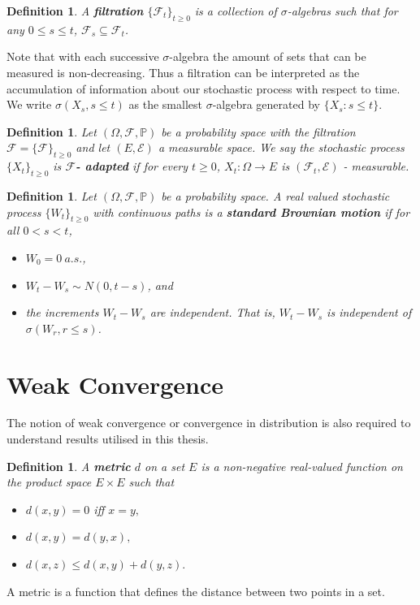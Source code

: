 \documentclass[honours,12pt,twoside, openright]{unswthesis}
\newcommand{\PP}{\mathbb{P}}
\newcommand{\1}{\mathbf 1}
\newcommand{\FF}{\mathcal{F}}
\newtheorem{definition}[equation]{Definition}
\numberwithin{equation}{section}
\theoremstyle{definition}
\theoremstyle{remark}
\begin{document}
\begin{definition}
A \textbf{filtration} $\{\FF_t\}_{t\geq 0}$ is a collection of $\sigma$-algebras such that for any $0\leq s \leq t$, $\FF_s \subseteq \FF_t$.\\
\end{definition}

{\noindent}Note that with each successive $\sigma$-algebra the amount of sets that can be measured is non-decreasing. Thus a filtration can be interpreted as the accumulation of information about our stochastic process with respect to time. We write $\sigma(X_s,s\leq t)$ as the smallest $\sigma$-algebra generated by $\{X_s: s\leq t\}$.\\

\begin{definition}
Let $(\Omega,\FF,\PP)$ be a probability space with the filtration $\FF = \{\FF\}_{t\geq 0}$ and let $(E,\mathcal{E})$ a measurable space. We say the stochastic process $\{X_t\}_{t\geq 0}$ is $\boldsymbol{\FF}$\textbf{- adapted} if for every $t\geq 0$, $X_t: \Omega \rightarrow E$ is $(\FF_t, \mathcal{E})$ - measurable.\\
\end{definition}

\begin{definition}
Let $(\Omega, \FF,\PP)$ be a probability space. A real valued stochastic process $\{W_t\}_{t\geq 0}$ with continuous paths is a \textbf{standard Brownian motion} if for all $0<s<t$,
\begin{itemize}
\item $W_0 = 0\ a.s.$,
\item $W_t - W_s \sim N(0,t-s)$, and
\item the increments $W_t - W_s$ are independent. That is, $W_t - W_s$ is independent of $\sigma(W_r,r\leq s)$.\\
\end{itemize}
\end{definition}

\section{Weak Convergence}
The notion of weak convergence or convergence in distribution is also required to understand results utilised in this thesis.\\

\begin{definition}
A \textbf{metric} $d$ on a set $E$ is a non-negative real-valued function on the product space $E\times E$ such that
	\begin{itemize}
		\item $d(x,y)=0$ iff $x=y,$
		\item $d(x,y)=d(y,x),$
		\item $d(x,z) \leq d(x,y)+d(y,z).$
	\end{itemize}
\end{definition}
\noindent A metric is a function that defines the distance between two points in a set.\\
\end{document}
